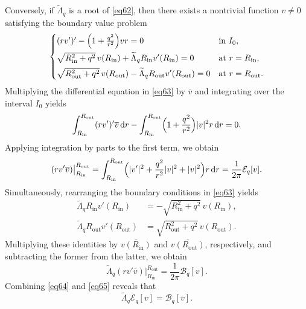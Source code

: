 \documentclass[12pt,reqno]{amsart}
\numberwithin{equation}{section}
\begin{document}
Conversely, if $\widetilde{\Lambda}_q$ is a root of \eqref{eq62}, then there exists a nontrivial function $v \neq 0$ satisfying the boundary value problem
\begin{equation}\label{eq63}
\begin{cases}
    (r v')' - \Bigl( 1 + \frac{q^2}{r^2} \Bigr) v r = 0 & \text{in } I_0, \\[6pt]
    \sqrt{R_{\mathrm{in}}^2 + q^2} \, v(R_{\mathrm{in}}) + \widetilde{\Lambda}_q R_{\mathrm{in}} v'(R_{\mathrm{in}}) = 0 & \text{at } r = R_{\mathrm{in}}, \\[4pt]
    \sqrt{R_{\mathrm{out}}^2 + q^2} \, v(R_{\mathrm{out}}) - \widetilde{\Lambda}_q R_{\mathrm{out}} v'(R_{\mathrm{out}}) = 0 & \text{at } r = R_{\mathrm{out}}.
\end{cases}
\end{equation}
Multiplying the differential equation in \eqref{eq63} by $\overline{v}$ and integrating over the interval $I_0$ yields
\begin{equation*}
    \int_{R_{\mathrm{in}}}^{R_{\mathrm{out}}} (r v')' \overline{v} \, {\rm d}r - \int_{R_{\mathrm{in}}}^{R_{\mathrm{out}}} \Bigl( 1 + \frac{q^2}{r^2} \Bigr) |v|^2 r \, {\rm d}r = 0.
\end{equation*}
Applying integration by parts to the first term, we obtain
\begin{equation}\label{eq64}
    (r v' \overline{v}) \big|_{R_{\mathrm{in}}}^{R_{\mathrm{out}}} 
    = \int_{R_{\mathrm{in}}}^{R_{\mathrm{out}}} \Bigl( |v'|^2 + \frac{q^2}{r^2} |v|^2 + |v|^2 \Bigr) r \, {\rm d}r 
    = \frac{1}{2\pi} \mathcal{E}_q[v].
\end{equation}
Simultaneously, rearranging the boundary conditions in \eqref{eq63} yields
\begin{equation*}
\begin{aligned}
    \widetilde{\Lambda}_q R_{\mathrm{in}} v'(R_{\mathrm{in}}) &= - \sqrt{R_{\mathrm{in}}^2 + q^2} \, v(R_{\mathrm{in}}), \\
    \widetilde{\Lambda}_q R_{\mathrm{out}} v'(R_{\mathrm{out}}) &= \sqrt{R_{\mathrm{out}}^2 + q^2} \, v(R_{\mathrm{out}}).
\end{aligned}
\end{equation*}
Multiplying these identities by $\overline{v(R_{\mathrm{in}})}$ and $\overline{v(R_{\mathrm{out}})}$, respectively, and subtracting the former from the latter, we obtain
\begin{equation}\label{eq65}
    \widetilde{\Lambda}_q (r v' \overline{v}) \big|_{R_{\mathrm{in}}}^{R_{\mathrm{out}}} = \frac{1}{2\pi} \mathcal{B}_q[v].
\end{equation}
Combining \eqref{eq64} and \eqref{eq65} reveals that
\begin{equation*}
    \widetilde{\Lambda}_q \mathcal{E}_q[v] = \mathcal{B}_q[v].
\end{equation*}
\end{document}
